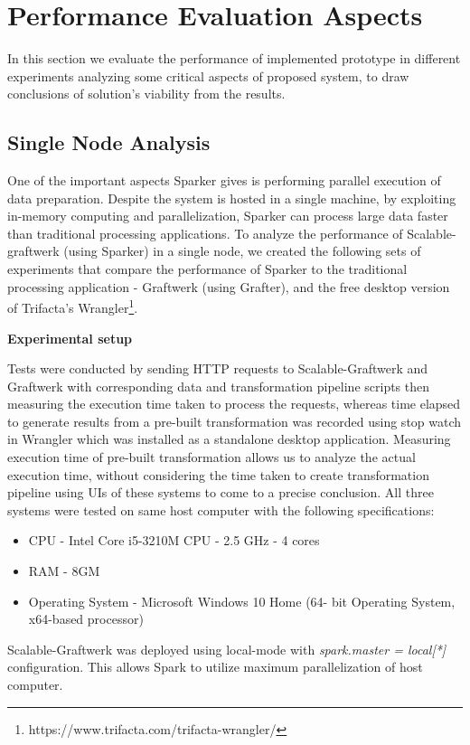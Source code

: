 \section{Performance Evaluation Aspects}
In this section we evaluate the performance of implemented prototype in different experiments analyzing some critical aspects of proposed system, to draw conclusions of solution's viability from the results.
\subsection{Single Node Analysis}
\label{singlenode}
One of the important aspects Sparker gives is performing parallel execution of data preparation. Despite the system is hosted in a single machine, by exploiting in-memory computing and parallelization, Sparker can process large data faster than traditional processing applications. To analyze the performance of Scalable-graftwerk (using Sparker) in a single node, we created the following sets of experiments that compare the performance of Sparker to the traditional processing application - Graftwerk (using Grafter), and the free desktop version of Trifacta's Wrangler\footnote{https://www.trifacta.com/trifacta-wrangler/}. 

\textbf{Experimental setup}

Tests were conducted by sending HTTP requests to Scalable-Graftwerk and Graftwerk with corresponding data and transformation pipeline scripts then measuring the execution time taken to process the requests, whereas time elapsed to generate results from a pre-built transformation was recorded using stop watch in Wrangler which was installed as a standalone desktop application. Measuring execution time of pre-built transformation allows us to analyze the actual execution time, without considering the time taken to create transformation pipeline using UIs of these systems to come to a precise conclusion. All three systems were tested on same host computer with the following specifications:
\begin{itemize}
\item CPU - Intel Core i5-3210M CPU - 2.5 GHz - 4 cores
\item RAM - 8GM 
\item Operating System - Microsoft Windows 10 Home (64- bit Operating System, x64-based processor)
\end{itemize}
Scalable-Graftwerk was deployed using local-mode with \textit{ spark.master = local[*]} configuration. This allows Spark to utilize maximum parallelization of host computer.  

